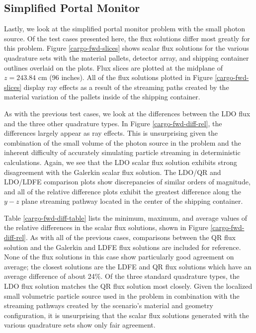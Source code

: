 \documentclass{article} %
\begin{document}
\FloatBarrier
\subsection{Simplified Portal Monitor}

Lastly, we look at the simplified portal monitor problem with the small photon
source. Of the test cases presented here, the flux solutions differ most
greatly for this problem. Figure \ref{cargo-fwd-slices} shows scalar flux
solutions for the various quadrature sets with the material pallets,
detector array, and shipping container outlines overlaid on the plots. Flux
slices are plotted at the midplane of $z = 243.84$ cm (96 inches). All of the
flux solutions plotted in Figure \ref{cargo-fwd-slices} display ray effects
as a result of the streaming paths created by the material variation of the
pallets inside of the shipping container.

As with the previous test cases, we look at the differences between the 
LDO flux and the three other quadrature types. In Figure
\ref{cargo-fwd-diff-rel}, the differences largely appear as ray effects. This
is unsurprising given the combination of the small volume of the photon 
source in the problem and the inherent difficulty of accurately simulating
particle streaming in deterministic calculations. Again, we see that the LDO
scalar flux solution exhibits strong disagreement with the Galerkin scalar
flux solution. The LDO/QR and LDO/LDFE comparison plots show discrepancies of
similar orders of magnitude, and all of the relative difference plots exhibit
the greatest difference along the $y-z$ plane streaming pathway located in the
center of the shipping container.

Table \ref{cargo-fwd-diff-table} lists the minimum, maximum, and average
values of the relative differences in the scalar flux solutions, shown in
Figure \ref{cargo-fwd-diff-rel}. As with all of the previous cases,
comparisons between the QR flux solution and the Galerkin and LDFE flux
solutions are included for reference. None of the flux solutions in this case
show particularly good agreement on average; the closest solutions are the
LDFE and QR flux solutions which have an average difference of about 24\%. Of
the three standard quadrature types, the LDO flux solution matches the QR flux
solution most closely. Given the localized small volumetric particle source
used in the problem in  combination with the streaming pathways created by the
scenario's material and geometry configuration, it is unsurprising that the
scalar flux solutions generated with the various quadrature sets show only
fair agreement.
\end{document}
